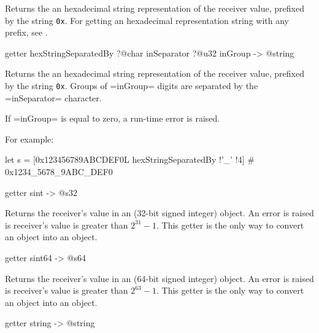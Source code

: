 Returns the an hexadecimal string representation of the receiver value, prefixed by the string \texttt{0x}. For getting an hexadecimal representation string with any prefix, see .







\begin{galgas4}
getter hexStringSeparatedBy ?@char inSeparator ?@u32 inGroup -> @string
\end{galgas4}

Returns the an hexadecimal string representation of the receiver value, prefixed by the string \texttt{0x}. Groups of \ggsq=inGroup= digits are separated by the \ggsq=inSeparator= character.

If \ggsq=inGroup= is equal to zero, a run-time error is raised.

For example:
\begin{galgas4}
let s = [0x123456789ABCDEF0L hexStringSeparatedBy !'_' !4] # 0x1234_5678_9ABC_DEF0
\end{galgas4}






\begin{galgas4}
getter sint -> @s32
\end{galgas4}

Returns the receiver's value in an  (32-bit signed integer) object. An error is raised is receiver's value is greater than $2^{31}-1$. This getter is the only way to convert an  object into an  object.




\begin{galgas4}
getter sint64 -> @s64
\end{galgas4}

Returns the receiver's value in an  (64-bit signed integer) object. An error is raised is receiver's value is greater than $2^{63}-1$. This getter is the only way to convert an  object into an  object.



\begin{galgas4}
getter string -> @string
\end{galgas4}

